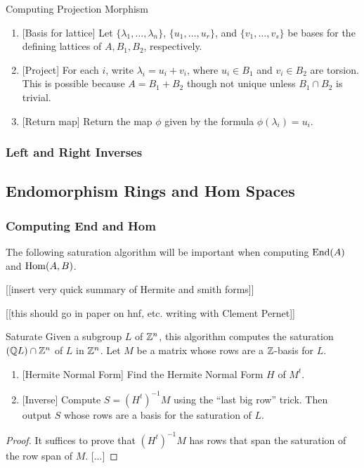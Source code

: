 \documentclass{article}
\begin{document}
\begin{algorithm}{Computing Projection Morphism}
    \begin{enumerate}
        \item{} [Basis for lattice]
            Let $\{\lambda_1,\ldots,\lambda_n\}$, $\{u_1,\ldots,u_r\}$, and
            $\{v_1,\ldots,v_s\}$ be bases for the defining lattices of $A, B_1,
            B_2$, respectively.
        \item{} [Project]
            For each $i$, write $\lambda_i=u_i+v_i$, where $u_i\in B_1$ and
            $v_i\in B_2$ are torsion. This is possible because $A=B_1+B_2$
            though not unique unless $B_1\cap B_2$ is trivial.
        \item{} [Return map]
            Return the map $\phi$ given by the formula $\phi(\lambda_i)=u_i$.
    \end{enumerate}
\end{algorithm}

\subsubsection{Left and Right Inverses}

\subsection{Endomorphism Rings and Hom Spaces}

\subsubsection{Computing End and Hom}

The following saturation algorithm will be important
when computing $\operatorname{End}(A)$ and $\operatorname{Hom}(A,B)$.

[[insert very quick summary of Hermite and smith forms]]

[[this should go in paper on hnf, etc. writing with
Clement Pernet]]

\begin{algorithm}{Saturate}
Given a subgroup $L$ of $\mathbb{Z}^n$, this algorithm computes
the saturation $(\mathbb{Q} L) \cap \mathbb{Z}^n$ of $L$ in $\mathbb{Z}^n$.
Let $M$ be a matrix whose rows are a $\mathbb{Z}$-basis for $L$.

\begin{enumerate}
\item{} [Hermite Normal Form] Find the Hermite Normal Form $H$ of $M^t$.
\item{} [Inverse] Compute $S = (H^t)^{-1} M$ using the ``last big row'' trick.
Then output $S$ whose rows are a basis for the saturation of $L$.
\end{enumerate}
\end{algorithm}
\begin{proof}
It suffices to prove that $(H^t)^{-1}M$ has rows that span the
saturation of the row span of $M$.
[...]
\end{proof}
\end{document}
